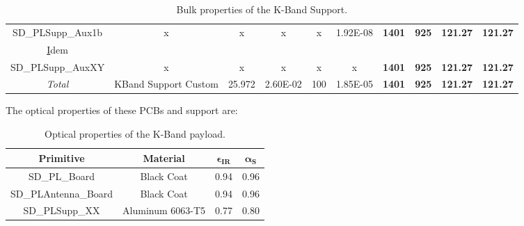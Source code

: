 \begin{table}[H]
{\begin{tabular}{@{}cccccccccc@{}}
      SD\_PLSupp\_Aux1b            & x                 & x              & x                & x                          & 1.92E-08               & \textbf{1401}                     & \textbf{925}                          & \textbf{121.27}                           & \textbf{121.27}                           \\
      {\ul Idem}                   &                   &                &                 &                            &                                 &                                   &                                       &                                           &                                           \\
      SD\_PLSupp\_AuxXY            & x                 & x              & x               & x                          & x                      & \textbf{1401}                     & \textbf{925}                          & \textbf{121.27}                           & \textbf{121.27}                           \\
      \textit{Total}               & KBand Support Custom            & 25.972         & 2.60E-02        & 100                          & 1.85E-05                        & \textbf{1401}                     & \textbf{925}                          & \textbf{121.27}                           & \textbf{121.27}                           \\ \bottomrule
      \end{tabular}
  }
  \caption{Bulk properties of the K-Band Support.}
\end{table}

The optical properties of these PCBs and support are:

\begin{table}[H]
  \centering
  \begin{tabular}{@{}cccc@{}}
  \toprule
  \textbf{Primitive}   & \textbf{Material}                      & $\mathbf{\epsilon_{IR}}$ & $\mathbf{\alpha_{S}}$ \\ \midrule
  SD\_PL\_Board        & Black Coat                            & 0.94                     & 0.96                  \\
  SD\_PLAntenna\_Board & Black Coat                            & 0.94                     & 0.96                  \\
  SD\_PLSupp\_XX       & \multicolumn{1}{l}{Aluminum   6063-T5} & 0.77                     & 0.80                  \\ \bottomrule
  \end{tabular}
  \caption{Optical properties of the K-Band payload.}
\end{table}

